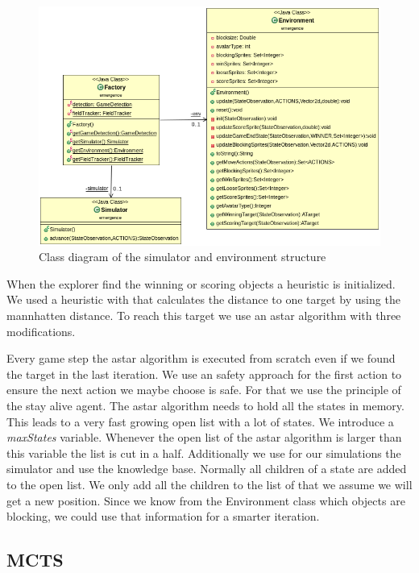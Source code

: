\begin{figure}
\centering
\includegraphics[scale=0.5]{images/classes.png}
\caption{Class diagram of the simulator and environment structure}
\label{fig:sim_classes}
\end{figure}


When the explorer find the winning or scoring objects a heuristic is initialized. We used a heuristic with that 
calculates the distance to one target by using the mannhatten distance. To reach this target we use an astar 
algorithm with three modifications.

Every game step the astar algorithm is executed from scratch even if we found the target in the last iteration.
We use an safety approach for the first action to ensure the next action we maybe choose is safe. For that we
use the principle of the stay alive agent. The astar algorithm needs to hold all the states in memory.
This leads to a very fast growing open list with a lot of states. We introduce a \textit{maxStates} variable. 
Whenever the open list of the astar algorithm is larger than this variable the list is cut in a half.
Additionally we use for our simulations the simulator and use the knowledge base. Normally all children of
a state are added to the open list. We only add all the children to the list of that we assume we will get a 
new position. Since we know from the Environment class which objects are blocking, we could use that information
for a smarter iteration.


\subsection{MCTS} 

